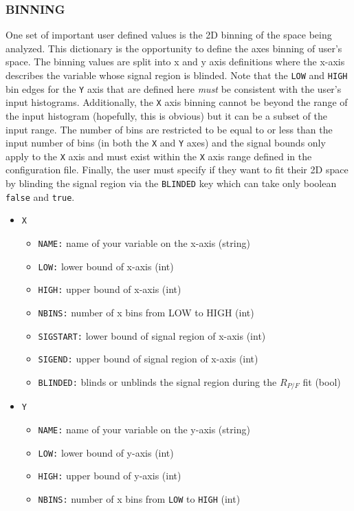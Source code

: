 \documentclass[letter]{article}
\begin{document}
        \subsubsection{BINNING}
            One set of important user defined values is the 2D binning of the space being analyzed. This dictionary is the opportunity to define the axes binning of user's space. The binning values are split into x and y axis definitions where the x-axis describes the variable whose signal region is blinded. Note that the \verb"LOW" and \verb"HIGH" bin edges for the \verb"Y" axis that are defined here \textit{must} be consistent with the user's input histograms. Additionally, the \verb"X" axis binning cannot be beyond the range of the input histogram (hopefully, this is obvious) but it can be a subset of the input range. The number of bins are restricted to be equal to or less than the input number of bins (in both the \verb"X" and \verb"Y" axes) and the signal bounds only apply to the \verb"X" axis and must exist within the \verb"X" axis range defined in the configuration file. Finally, the user must specify if they want to fit their 2D space by blinding the signal region via the \verb"BLINDED" key which can take only boolean \verb"false" and \verb"true".
            \begin{itemize}
                \item \verb"X"
                \begin{itemize}
                    \item \verb"NAME:" name of your variable on the x-axis (string)
                    \item \verb"LOW:" lower bound of x-axis (int)
                    \item \verb"HIGH:" upper bound of x-axis (int)
                    \item \verb"NBINS:" number of x bins from LOW to HIGH (int)
                    \item \verb"SIGSTART:" lower bound of signal region of x-axis (int)
                    \item \verb"SIGEND:" upper bound of signal region of x-axis (int)
                    \item \verb"BLINDED:" blinds or unblinds the signal region during the $R_{P/F}$ fit (bool)
                \end{itemize}
                \item \verb"Y"
                \begin{itemize}
                    \item \verb"NAME:" name of your variable on the y-axis (string)
                    \item \verb"LOW:" lower bound of y-axis (int)
                    \item \verb"HIGH:" upper bound of y-axis (int)
                    \item \verb"NBINS:" number of x bins from \verb"LOW" to \verb"HIGH" (int)
                \end{itemize}
            \end{itemize}
\end{document}
